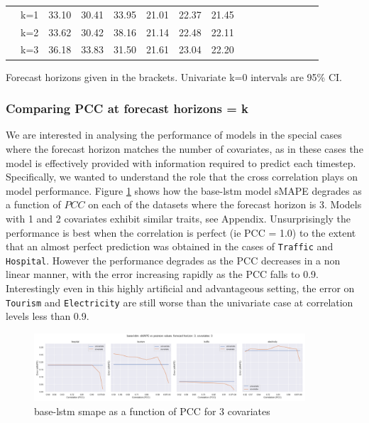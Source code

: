 \documentclass{article}
\newcommand{\pearson}{PCC}
\begin{document}
\begin{table}[tbp]
\begin{threeparttable}
\begin{small}
\begin{tabular}{c|c|cccccccccccccc}
    & k=1 & 33.10 & 30.41 & 33.95 & 21.01 & 22.37 & 21.45 \\
    & k=2 & 33.62 & 30.42 & 38.16 & 21.14 & 22.48 & 22.11 \\
    & k=3 & 36.18 & 33.83 & 31.50 & 21.61 & 23.04 & 22.20 \\
    \bottomrule
  \end{tabular}
  \begin{tablenotes}
    \item Forecast horizons given in the brackets. Univariate k=0 intervals are 95\% CI.
  \end{tablenotes}
  \end{small}
  \end{threeparttable}
  \label{tab:covariate_results}
  \vspace{-15pt}
\end{table}

\subsubsection{Comparing PCC at forecast horizons = k}
We are interested in analysing the performance of models in the special cases where the forecast horizon matches the number of covariates, as in these cases the model 
is effectively provided with information required to predict each timestep. Specifically, we wanted to understand the role that the cross correlation plays 
on model performance. Figure \ref{fig:base_lstm_k_3_smape_vs_pearson} shows how the base-lstm model sMAPE degrades as a function of $\pearson$ on each of the datasets where the 
forecast horizon is 3. Models with 1 and 2 covariates exhibit similar traits, see Appendix. Unsurprisingly the performance is best when the correlation 
is perfect (ie PCC = 1.0) to the extent that an almost perfect prediction was obtained in the cases of \texttt{Traffic} and \texttt{Hospital}. However the performance degrades as the PCC decreases 
in a non linear manner, with the error increasing rapidly as the PCC falls to 0.9. Interestingly even in this highly artificial and advantageous setting, the error on \texttt{Tourism} 
and \texttt{Electricity} are still worse than the univariate case at correlation levels less than 0.9.
\begin{figure}[ht]
\centering
\includegraphics[width=0.9\textwidth]{figures/base_k3_pe_pcc.png}
\caption{base-lstm smape as a function of PCC for 3 covariates}
\label{fig:base_lstm_k_3_smape_vs_pearson}
\end{figure}
\end{document}
